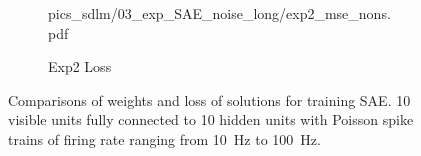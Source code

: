 \begin{figure}
\begin{subfigure}[c]{0.45\textwidth}
{			{pics_sdlm/03_exp_SAE_noise_long/exp2_mse_nons.pdf}}
		\\
		\caption{Exp2 Loss}
	\end{subfigure}%
	\caption{Comparisons of weights and loss of solutions for training SAE. 10 visible units fully connected to 10 hidden units with Poisson spike trains of firing rate ranging from 10~Hz to 100~Hz.}
	\label{fig:sols_ae}
\end{figure}

